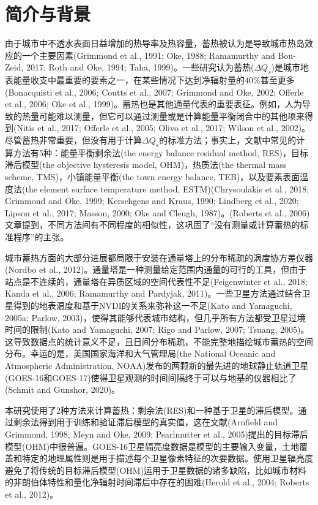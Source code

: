 \documentclass[3p,times]{elsarticle}
\begin{document}

\section{简介与背景}

由于城市中不透水表面日益增加的热导率及热容量，蓄热被认为是导致城市热岛效应的一个主要因素(Grimmond et al., 1991; Oke, 1988; Ramamurthy and Bou-Zeid, 2017; Roth and Oke, 1994; Taha, 1999)。一些研究认为蓄热($\Delta Q_s$)是城市地表能量收支中最重要的要素之一，在某些情况下达到净辐射量的$40\%$甚至更多(Bonacquisti et al., 2006; Coutts et al., 2007; Grimmond and Oke, 2002; Offerle et al., 2006; Oke et al., 1999)。蓄热也是其他通量代表的重要表征。例如，人为导致的热量可能难以测量，但它可以通过测量或是计算能量平衡闭合中的其他项来得到(Nitis et al., 2017; Offerle et al., 2005; Olivo et al., 2017; Wilson et al., 2002)。尽管蓄热非常重要，但没有用于计算$\Delta Q_s$的标准方法；事实上，文献中常见的计算方法有5种：能量平衡剩余法(the energy balance residual method, RES)，目标滞后模型(the objective hysteresis model, OHM)，热质法(the thermal mass scheme, TMS)，小镇能量平衡(the town energy balance, TEB)，以及要素表面温度法(the element surface temperature method, ESTM)(Chrysoulakis et al., 2018; Grimmond and Oke, 1999; Kerschgens and Kraus, 1990; Lindberg et al., 2020; Lipson et al., 2017; Masson, 2000; Oke and Cleugh, 1987)。(Roberts et al., 2006)文章提到，不同方法间有不同程度的相似性，这巩固了“没有测量或计算蓄热的标准程序”的主张。

城市蓄热方面的大部分进展都局限于安装在通量塔上的分布稀疏的涡度协方差仪器(Nordbo et al., 2012)。通量塔是一种测量给定范围内通量的可行的工具，但由于站点是不连续的，通量塔在异质区域的空间代表性不足(Feigenwinter et al., 2018; Kanda et al., 2006; Ramamurthy and Pardyjak, 2011)。一些卫星方法通过结合卫星得到的地表温度和基于NVDI的关系来弥补这一不足(Kato and Yamaguchi, 2005a; Parlow, 2003)，使得其能够代表城市结构，但几乎所有方法都受卫星过境时间的限制(Kato and Yamaguchi, 2007; Rigo and Parlow, 2007; Tsuang, 2005)。这导致数据点的统计意义不足，且日间分布稀疏，不能完整地描绘城市蓄热的空间分布。幸运的是，美国国家海洋和大气管理局(the National Oceanic and Atmospheric Administration, NOAA)发布的两颗新的最先进的地球静止轨道卫星(GOES-16和GOES-17)使得卫星观测的时间间隔终于可以与地基的仪器相比了(Schmit and Gunshor, 2020)。

本研究使用了2种方法来计算蓄热：剩余法(RES)和一种基于卫星的滞后模型。通过剩余法得到用于训练和验证滞后模型的真实值，这在文献(Arnfield and Grimmond, 1998; Meyn and Oke, 2009; Pearlmutter et al., 2005)提出的目标滞后模型(OHM)中很普遍。GOES-16卫星辐亮度数据是模型的主要输入变量，土地覆盖和特定的地理属性则是用于描述每个卫星像素特征的次要数据。使用卫星辐亮度避免了将传统的目标滞后模型(OHM)运用于卫星数据的诸多缺陷，比如城市材料的非朗伯体特性和量化净辐射时间滞后中存在的困难(Herold et al., 2004; Roberts et al., 2012)。
\end{document}
